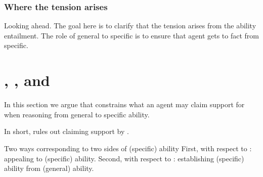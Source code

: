 \subsubsection{Where the tension arises}
\label{sec:where-tension-arises}

\begin{note}
  {
    \color{red}
    Looking ahead.
  }
  The goal here is to clarify that the tension arises from the ability entailment.
  The role of general to specific is to ensure that agent gets to fact from specific.
\end{note}


\section{\ESU{}, \gsi{}, and }
\label{sec:first-conditional}

\begin{note}[Summary]
  In this section we argue that \ESU{} constrains what an agent may claim support for when reasoning from general to specific ability.

  In short, \ESU{} rules out claiming support by \adB{}.
\end{note}

\begin{note}
  Two ways corresponding to two sides of (specific) ability
  First, with respect to : appealing to (specific) ability.
  Second, with respect to \gsi{}: establishing (specific) ability from (general) ability.
\end{note}

